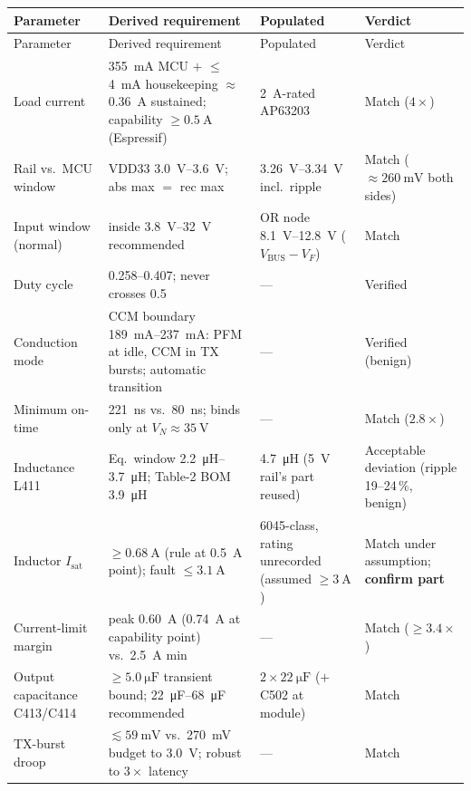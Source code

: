 \begin{longtable}{@{}p{}p{}p{}p{}@{}}
\toprule
Parameter & Derived requirement & Populated & Verdict \\
\midrule
\endfirsthead
\toprule
Parameter & Derived requirement & Populated & Verdict \\
\midrule
\endhead
\bottomrule
\endlastfoot
Load current & \SI{355}{\milli\ampere} MCU $+$ $\leq$\SI{4}{\milli\ampere}
  housekeeping $\approx$ \SI{0.36}{\ampere} sustained; capability
  $\geq\SI{0.5}{\ampere}$ (Espressif) & \SI{2}{\ampere}-rated AP63203 &
  Match ($4\times$) \\
Rail vs.\ MCU window & VDD33 \SIrange{3.0}{3.6}{\volt}; abs max $=$ rec max &
  \SIrange{3.26}{3.34}{\volt} incl.\ ripple & Match
  ($\approx\SI{260}{\milli\volt}$ both sides) \\
Input window (normal) & inside \SIrange{3.8}{32}{\volt} recommended & OR node
  \SIrange{8.1}{12.8}{\volt} ($V_{\mathrm{BUS}}-V_F$) & Match \\
Duty cycle & 0.258--0.407; never crosses 0.5 & --- & Verified \\
Conduction mode & CCM boundary \SIrange{189}{237}{\milli\ampere}: PFM at idle,
  CCM in TX bursts; automatic transition & --- & Verified (benign) \\
Minimum on-time & \SI{221}{\nano\second} vs.\ \SI{80}{\nano\second}; binds only
  at $V_N\approx\SI{35}{\volt}$ & --- & Match ($2.8\times$) \\
Inductance L411 & Eq.\ window \SIrange{2.2}{3.7}{\micro\henry}; Table-2 BOM
  \SI{3.9}{\micro\henry} & \SI{4.7}{\micro\henry} (5~V rail's part reused) &
  Acceptable deviation (ripple 19--24\,\%, benign) \\
Inductor $I_{\mathrm{sat}}$ & $\geq\SI{0.68}{\ampere}$ (rule at
  \SI{0.5}{\ampere} point); fault $\leq\SI{3.1}{\ampere}$ & 6045-class, rating
  unrecorded (assumed $\geq\SI{3}{\ampere}$) & Match under assumption;
  \textbf{confirm part} \\
Current-limit margin & peak \SI{0.60}{\ampere} (\SI{0.74}{\ampere} at
  capability point) vs.\ \SI{2.5}{\ampere} min & --- & Match ($\geq3.4\times$) \\
Output capacitance C413/C414 & $\geq\SI{5.0}{\micro\farad}$ transient bound;
  \SIrange{22}{68}{\micro\farad} recommended & $2\times\SI{22}{\micro\farad}$
  ($+$ C502 at module) & Match \\
TX-burst droop & $\lesssim\SI{59}{\milli\volt}$ vs.\ \SI{270}{\milli\volt}
  budget to \SI{3.0}{\volt}; robust to $3\times$ latency & --- & Match \\

\end{longtable}
